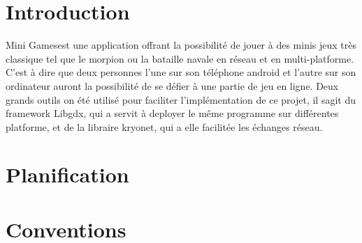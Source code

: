 \documentclass{report}
\title{\projectName}
\author{M. \textsc{Friedli}, A. \textsc{Gillioz}, J. \textsc{Guerne}\\
He-Arc Ingénierie\\
2000 Neuchatel}
\date{\today{}}
\newcommand{\projectName}{Mini Games}
\begin{document}
\maketitle{}
\begin{abstract}
La HES d'été permet aux étudiants de deuxième année d'étude dans le domaine de l'informatique
la possibilité de travailler sur un projet libre dans le but d'approfondir leurs connaissances.

Ce rapport décrit, explique les choix d'implémentations pris dans la réalisation de notre
projet \projectName.

Une planification des tâches ainsi qu'une spécification du travaille ont été réalisés dans le but
d'organiser au mieux le temps à disposition.
\end{abstract}
\tableofcontents

\chapter{Introduction}
\projectName est une application offrant la possibilité de jouer à des minis jeux très classique tel
que le morpion ou la bataille navale en réseau et en multi-platforme. C'est à dire que deux personnes
l'une sur son téléphone android et l'autre sur son ordinateur auront la possibilité de se défier à une partie de jeu en ligne.
Deux grands outils on été utilisé pour faciliter l'implémentation de ce projet, il sagit du framework Libgdx, qui a servit à
deployer le même programme sur différentes platforme, et de la libraire kryonet, qui a elle facilitée les échanges réseau.

\chapter{Planification}

\chapter{Conventions}
\end{document}
